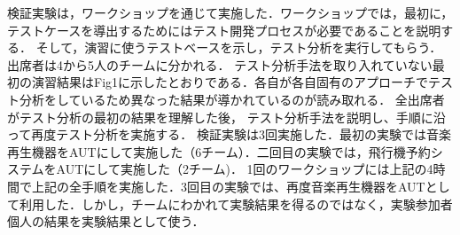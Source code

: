 \documentclass[a4paper,11pt]{jreport}
\begin{document}
検証実験は，ワークショップを通じて実施した．ワークショップでは，最初に，テストケースを導出するためにはテスト開発プロセスが必要であることを説明する．
そして，演習に使うテストベースを示し，テスト分析を実行してもらう．出席者は4から5人のチームに分かれる．
テスト分析手法を取り入れていない最初の演習結果はFig1に示したとおりである．各自が各自固有のアプローチでテスト分析をしているため異なった結果が導かれているのが読み取れる．
全出席者がテスト分析の最初の結果を理解した後， テスト分析手法を説明し、手順に沿って再度テスト分析を実施する．
検証実験は3回実施した．最初の実験では音楽再生機器をAUTにして実施した（6チーム）．二回目の実験では，飛行機予約システムをAUTにして実施した（2チーム)．
1回のワークショップには上記の4時間で上記の全手順を実施した．3回目の実験では、再度音楽再生機器をAUTとして利用した．しかし，チームにわかれて実験結果を得るのではなく，実験参加者個人の結果を実験結果として使う．
\end{document}
